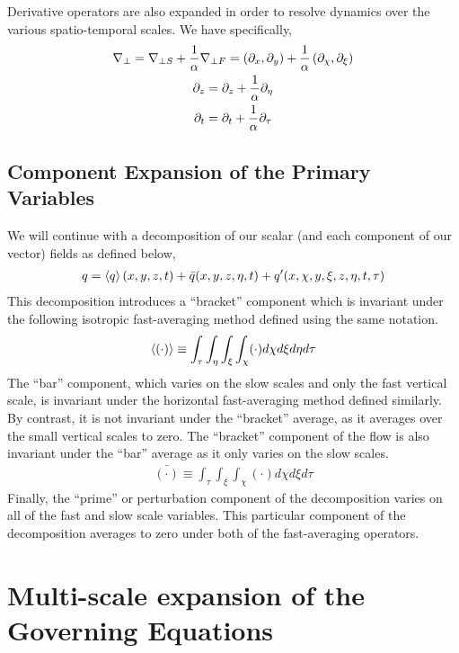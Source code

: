 \documentclass{article}
\begin{document}
Derivative operators are also expanded in order to resolve dynamics over the
various spatio-temporal scales. We have specifically, 
\begin{gather*}
    \nabla_{\perp} = \nabla_{\perp S} + \frac{1}{\alpha}\nabla_{\perp F} = \left(\partial_x,
    \partial_y\right)+ \frac{1}{\alpha}\left(\partial_{\chi},
    \partial_{\xi}\right)\\
    \partial_z = \partial_z + \frac{1}{\alpha}\partial_{\eta}\\
    \partial_t = \partial_t + \frac{1}{\alpha}\partial_{\tau}
\end{gather*}

\subsection{Component Expansion of the Primary Variables}
We will continue with a decomposition of our scalar (and each component of our
vector) fields as defined below,
\begin{gather}
    q = \left<q\right>(x,y,z,t) + \bar{q}(x,y,z,\eta,t) +
    q'(x,\chi,y,\xi,z,\eta,t,\tau) \label{eq:flow_components}
\end{gather}
This decomposition introduces a ``bracket'' component which is invariant
under the following isotropic fast-averaging method defined using the same
notation.
\begin{gather}
    \left<(\cdot)\right> \equiv \int_{\tau}\int_{\eta}\int_{\xi}\int_{\chi} (\cdot)
    d\chi d\xi d\eta d\tau \label{eq:fast_avg_iso}
\end{gather}
The ``bar'' component, which varies on the slow scales and only the fast
vertical scale, is invariant under the horizontal fast-averaging method defined
similarly. By contrast, it is not invariant under the ``bracket'' average, as it
averages over the small vertical scales to zero. The ``bracket'' component of the flow
is also invariant under the ``bar'' average as it only varies on the slow
scales. 
\begin{gather}
    \bar{(\cdot)} \equiv \int_{\tau}\int_{\xi}\int_{\chi} (\cdot)
    d\chi d\xi d\tau \label{eq:fast_avg_horiz}
\end{gather}
Finally, the ``prime'' or perturbation component of the decomposition varies on
all of the fast and slow scale variables. This particular component of the
decomposition averages to zero under both of the fast-averaging operators.


\section{Multi-scale expansion of the Governing Equations}
\end{document}
